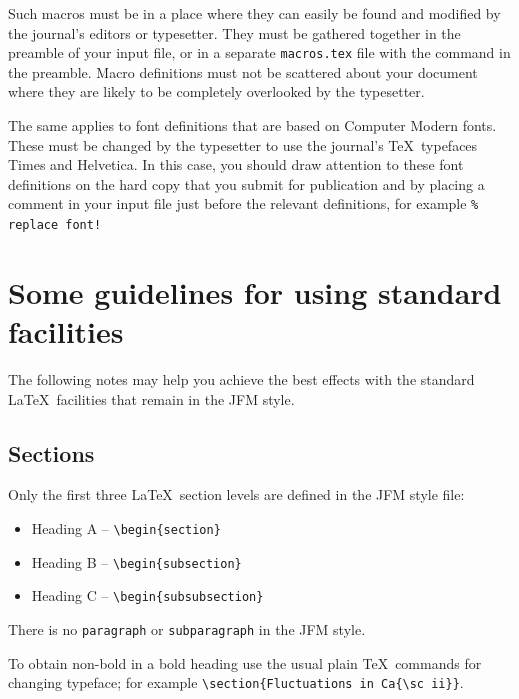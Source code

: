 Such macros must be in a place where they can easily be found and
modified by the journal's editors or typesetter. They must be gathered
together in the preamble of your input file, or in a separate
\verb"macros.tex" file with the command \verb"" in the
preamble. Macro definitions must not be scattered about your document
where they are likely to be completely overlooked by the typesetter.

The same applies to font definitions that are based on Computer Modern
fonts. These must be changed by the typesetter to use the journal's
\TeX\ typefaces Times and Helvetica. In this case, you should draw
attention to these font definitions on the hard copy that you submit for
publication and by placing a comment in your input file just before the
relevant definitions, for example \verb"% replace font!"


\section{Some guidelines for using standard facilities}

The following notes may help you achieve the best effects with the
standard \LaTeX\ facilities that remain in the JFM style.

\subsection{Sections}

Only the first three \LaTeX\ section levels are defined in the JFM style
file:
\begin{itemize}
  \item[] Heading A -- \verb"\begin{section}"
  \item[] Heading B -- \verb"\begin{subsection}"
  \item[] Heading C -- \verb"\begin{subsubsection}"
\end{itemize}
There is no \verb"paragraph" or \verb"subparagraph" in the JFM style.

To obtain non-bold in a bold heading use the usual plain \TeX\ commands for
changing typeface; for example \verb"\section{Fluctuations in Ca{\sc ii}}".

